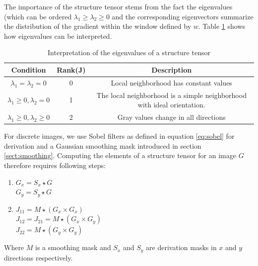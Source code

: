 		The importance of the structure tensor stems from the fact the eigenvalues (which can be ordered $\lambda_1 \geq \lambda_2 \geq 0$ and the corresponding eigenvectors summarize the distribution of the gradient within the window defined by $w$. Table \ref{tab:struc_tensor_interp} shows how eigenvalues can be interpreted.
		
		\begin{table}
		
			\begin{tabular}{|c|c|c|}
			\hline 
			Condition & Rank(J) & Description \\ 
			\hline 
			$ \lambda_1 = \lambda_2 = 0$  & 0 & Local neighborhood  has constant values\\ 
			\hline 
			$\lambda_1 \geq 0, \lambda_2 = 0 $ & 1 & The local neighborhood is a simple neighborhood with ideal orientation.  \\ 
			\hline
			 $\lambda_1 \geq 0, \lambda_2 \geq 0 $ & 2 & Gray values change in all directions \\
			\hline
			\end{tabular} 
			
			\caption{Interpretation of the eigenvalues of a structure tensor}
			\label{tab:struc_tensor_interp}
		\end{table}
		
		
		For discrete images, we use Sobel filters as defined in equation \ref{eq:sobel} for derivation and a Gaussian smoothing mask introduced in section \ref{sect:smoothing}. Computing the elements of a structure tensor for an image $G$ therefore requires following steps:
		\begin{enumerate}
			\item $G_x = S_x \star G$ \\
						$G_y = S_y \star G$
			\item $J_{11} = M \star (G_x \times G_x)$ \\
						 $J_{12} = J_{21} = M \star (G_x \times G_y)$ \\
						 $J_{22} = M \star (G_y \times G_y)$
		\end{enumerate}
		Where $M$ is a smoothing mask and $S_x$ and $S_y$ are derivation masks in $x$ and $y$ directions respectively.

